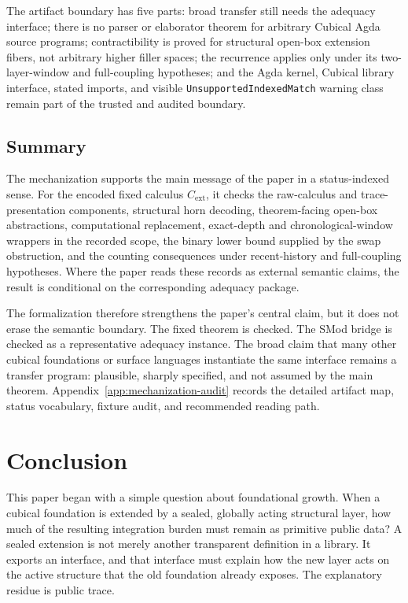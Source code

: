 \documentclass{lmcs}
\begin{document}
The artifact boundary has five parts: broad transfer still needs the adequacy interface; there
is no parser or elaborator theorem for arbitrary Cubical Agda source programs; contractibility
is proved for structural open-box extension fibers, not arbitrary higher filler spaces; the
recurrence applies only under its two-layer-window and full-coupling hypotheses; and the Agda
kernel, Cubical library interface, stated imports, and visible
\texttt{UnsupportedIndexedMatch} warning class remain part of the trusted and audited
boundary.

\subsection{Summary}
\label{subsec:mechanization-summary}

The mechanization supports the main message of the paper in a status-indexed sense.  For the
encoded fixed calculus \(C_{\mathrm{ext}}\), it checks the raw-calculus and trace-presentation
components, structural horn decoding, theorem-facing open-box abstractions, computational
replacement, exact-depth and chronological-window wrappers in the recorded scope, the binary
lower bound supplied by the swap obstruction, and the counting consequences under
recent-history and full-coupling hypotheses.  Where the paper reads these records as external
semantic claims, the result is conditional on the corresponding adequacy package.

The formalization therefore strengthens the paper's central claim, but it does not erase the
semantic boundary.  The fixed theorem is checked.  The SMod bridge is checked as a representative
adequacy instance.  The broad claim that many other cubical foundations or surface languages
instantiate the same interface remains a transfer program: plausible, sharply specified, and
not assumed by the main theorem.  Appendix~\ref{app:mechanization-audit} records the detailed
artifact map, status vocabulary, fixture audit, and recommended reading path.

\section{Conclusion}
\label{sec:conclusion}

This paper began with a simple question about foundational growth.  When a cubical
foundation is extended by a sealed, globally acting structural layer, how much of the
resulting integration burden must remain as primitive public data?  A sealed extension is
not merely another transparent definition in a library.  It exports an interface, and that
interface must explain how the new layer acts on the active structure that the old foundation
already exposes.  The explanatory residue is public trace.
\end{document}
